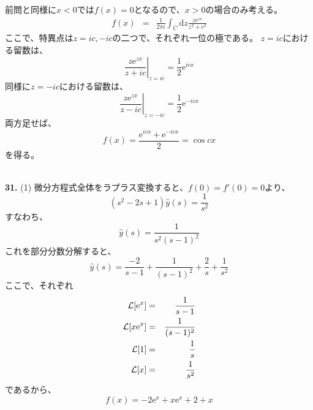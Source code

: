 \documentclass{jarticle}
\newcommand{\diff}{\mathrm d}
\newcommand{\ans}[2]{\noindent\\ {\bf \large #1.} (#2)}
\newcommand{\e}{\mathrm e}
\begin{document}
前問と同様に$x<0$では$f(x) = 0$となるので、$x>0$の場合のみ考える。
\begin{eqnarray}
  f(x) &=& \frac{1}{2 \pi i} \int_C \diff z \frac{z \e^{zx}}{z^2+c^2}
\end{eqnarray}
ここで、特異点は$z = ic, -ic$の二つで、それぞれ一位の極である。
$z = ic$における留数は、
\begin{equation}
  \left. \frac{z \e^{zx}}{z+ic} \right|_{z = ic} = \frac{1}{2}\e^{icx}
\end{equation}
同様に$z = -ic$における留数は、
\begin{equation}
  \left. \frac{z \e^{zx}}{z-ic} \right|_{z = -ic} = \frac{1}{2}\e^{-icx}
\end{equation}
両方足せば、
\begin{equation}
  f(x) = \frac{\e^{icx}+\e^{-icx}}{2} = \cos cx
\end{equation}
を得る。

\ans{31}{1}
微分方程式全体をラプラス変換すると、$f(0)=f'(0)=0$より、
\begin{equation}
  (s^2 - 2s +1) \hat{y}(s) = \frac{1}{s^2}
\end{equation}
すなわち、
\begin{equation}
  \hat{y}(s) = \frac{1}{s^2 (s-1)^2}
\end{equation}
これを部分分数分解すると、
\begin{equation}
  \hat{y}(s) = \frac{-2}{s-1} + \frac{1}{(s-1)^2} + \frac{2}{s} + \frac{1}{s^2}
\end{equation}
ここで、それぞれ
\begin{eqnarray}
  {\cal L}[\e^x] &=& \frac{1}{s-1}\\
  {\cal L}[x\e^x] &=& \frac{1}{(s-1)^2}\\
  {\cal L}[1] &=& \frac{1}{s}\\
  {\cal L}[x] &=& \frac{1}{s^2}
\end{eqnarray}
であるから、
\begin{equation}
  f(x) = -2 \e^{x}+x\e^x+2+x
\end{equation}
\end{document}
